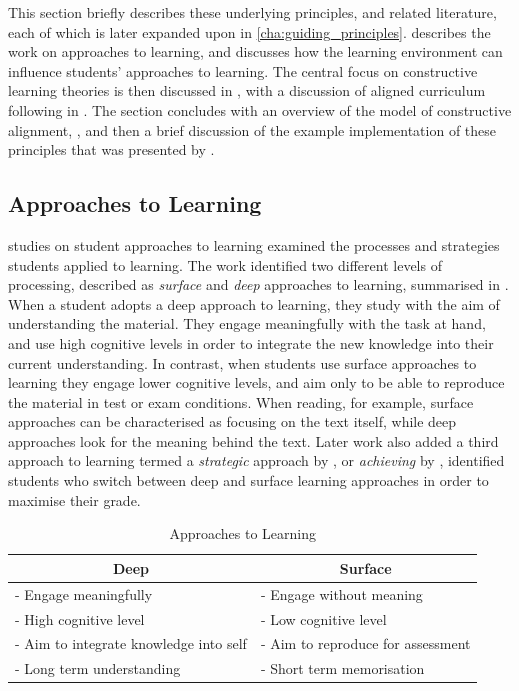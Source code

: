 This section briefly describes these underlying principles, and related literature, each of which is later expanded upon in \cref{cha:guiding_principles}.  describes the work on approaches to learning, and discusses how the learning environment can influence students' approaches to learning. The central focus on constructive learning theories is then discussed in , with a discussion of aligned curriculum following in . The section concludes with an overview of the model of constructive alignment, , and then a brief discussion of the example implementation of these principles that was presented by \citet{Biggs:1996c}.

\subsection{Approaches to Learning} %
\label{sub:approaches_to_learning}

\citet{Marton:1976a, Marton:1976b,Marton:2005} studies on student approaches to learning examined the processes and strategies students applied to learning. The work identified two different levels of processing, described as \emph{surface} and \emph{deep} approaches to learning, summarised in . When a student adopts a deep approach to learning, they study with the aim of understanding the material. They engage meaningfully with the task at hand, and use high cognitive levels in order to integrate the new knowledge into their current understanding. In contrast, when students use surface approaches to learning they engage lower cognitive levels, and aim only to be able to reproduce the material in test or exam conditions. When reading, for example, surface approaches can be characterised as focusing on the text itself, while deep approaches look for the meaning behind the text. Later work also added a third approach to learning termed a \emph{strategic} approach by \citet{Ramsden:1983}, or \emph{achieving} by  \citet{Biggs:1987}, identified students who switch between deep and surface learning approaches in order to maximise their grade. 

\begin{table}[h]
	\centering
	\caption{Approaches to Learning}
	\label{tbl:learning_approach}
	\begin{tabular}{l|l}
		\multicolumn{1}{c|}{\textbf{Deep}} & \multicolumn{1}{c}{\textbf{Surface}} \\
		\hline
		- Engage meaningfully & - Engage without meaning \\
		- High cognitive level & - Low cognitive level \\
		- Aim to integrate knowledge into self & - Aim to reproduce for assessment \\
		- Long term understanding & - Short term memorisation \\
	\end{tabular}
\end{table}

